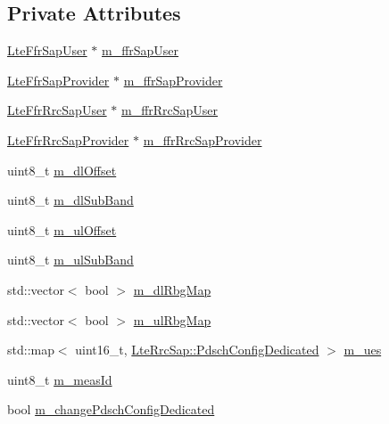\subsection*{Private Attributes}
\begin{DoxyCompactItemize}
\item 
\hyperlink{classns3_1_1LteFfrSapUser}{Lte\+Ffr\+Sap\+User} $\ast$ \hyperlink{classns3_1_1LteFfrSimple_ac6c0a98fe8ee4ae7d2c9257ca227216b}{m\+\_\+ffr\+Sap\+User}
\item 
\hyperlink{classns3_1_1LteFfrSapProvider}{Lte\+Ffr\+Sap\+Provider} $\ast$ \hyperlink{classns3_1_1LteFfrSimple_a9a66bcd0489558ac4f9c009e977be476}{m\+\_\+ffr\+Sap\+Provider}
\item 
\hyperlink{classns3_1_1LteFfrRrcSapUser}{Lte\+Ffr\+Rrc\+Sap\+User} $\ast$ \hyperlink{classns3_1_1LteFfrSimple_a7aa41ba9d4983c0d765b4f4f6e1f5a15}{m\+\_\+ffr\+Rrc\+Sap\+User}
\item 
\hyperlink{classns3_1_1LteFfrRrcSapProvider}{Lte\+Ffr\+Rrc\+Sap\+Provider} $\ast$ \hyperlink{classns3_1_1LteFfrSimple_a46ab1b799fd9db081988c598d9720c58}{m\+\_\+ffr\+Rrc\+Sap\+Provider}
\item 
uint8\+\_\+t \hyperlink{classns3_1_1LteFfrSimple_a60e29441b8323b122a1dce4fce2bb1a0}{m\+\_\+dl\+Offset}
\item 
uint8\+\_\+t \hyperlink{classns3_1_1LteFfrSimple_a4f071c341b36e2dc634d556be7dec056}{m\+\_\+dl\+Sub\+Band}
\item 
uint8\+\_\+t \hyperlink{classns3_1_1LteFfrSimple_aecad2931c0699de2c4df244e937dbea5}{m\+\_\+ul\+Offset}
\item 
uint8\+\_\+t \hyperlink{classns3_1_1LteFfrSimple_aaa17d1f4400375af086fcf3df4250bc6}{m\+\_\+ul\+Sub\+Band}
\item 
std\+::vector$<$ bool $>$ \hyperlink{classns3_1_1LteFfrSimple_a54da2e86147edb32976db19e8c4fb67c}{m\+\_\+dl\+Rbg\+Map}
\item 
std\+::vector$<$ bool $>$ \hyperlink{classns3_1_1LteFfrSimple_a959fbd224766db19d6e515a489edf85e}{m\+\_\+ul\+Rbg\+Map}
\item 
std\+::map$<$ uint16\+\_\+t, \hyperlink{structns3_1_1LteRrcSap_1_1PdschConfigDedicated}{Lte\+Rrc\+Sap\+::\+Pdsch\+Config\+Dedicated} $>$ \hyperlink{classns3_1_1LteFfrSimple_a65b61b7c06dc4ed1fc9159ddd79c34e4}{m\+\_\+ues}
\item 
uint8\+\_\+t \hyperlink{classns3_1_1LteFfrSimple_a267dc9ca96606efcbf61e5f26a8403f7}{m\+\_\+meas\+Id}
\item 
bool \hyperlink{classns3_1_1LteFfrSimple_ac0c8fa1a5bb3c7c1e6034916152411a1}{m\+\_\+change\+Pdsch\+Config\+Dedicated}

\end{DoxyCompactItemize}
